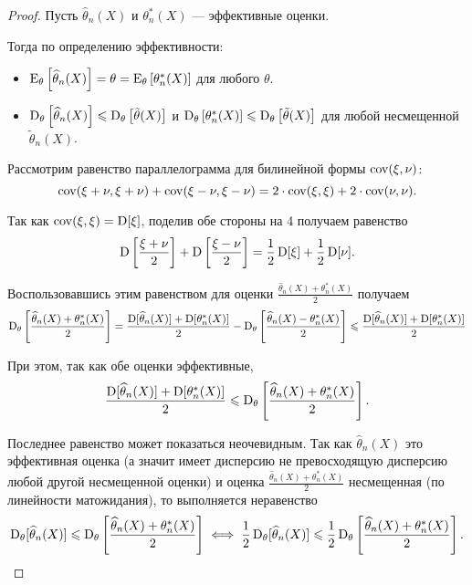 \begin{proof}
    Пусть $\widehat{\theta}_n(X)$ и $\theta_n^*(X)$ --- эффективные оценки.

    Тогда по определению эффективности:
    \begin{itemize}
    \item 
        $\operatorname{E}_{\theta}\left[\widehat{\theta}_n(X)\right] = \theta = \operatorname{E}_{\theta}\left[\theta_n^*(X)\right]$ для любого $\theta$.
    
    \item 
        $\operatorname{D}_{\theta}\left[\widehat{\theta}_n(X)\right] \leqslant \operatorname{D}_{\theta}\left[\tilde{\theta}(X)\right]$ и $\operatorname{D}_{\theta}\left[\theta_n^*(X)\right] \leqslant \operatorname{D}_{\theta}\left[\tilde{\theta}(X)\right]$ для любой несмещенной $\tilde{\theta}_n(X)$.
    \end{itemize}

    Рассмотрим равенство параллелограмма для билинейной формы $\operatorname{cov}(\xi, \nu)$:
    \begin{equation*}
        \operatorname{cov}(\xi + \nu, \xi + \nu) + \operatorname{cov}(\xi - \nu, \xi - \nu) = 2 \cdot \operatorname{cov}(\xi, \xi) + 2 \cdot \operatorname{cov}(\nu, \nu).
    \end{equation*}

    Так как $\operatorname{cov}(\xi, \xi) = \operatorname{D}[\xi]$, поделив обе стороны на 4 получаем равенство
    \begin{align*}
        \operatorname{D}\left[ \dfrac{\xi + \nu}{2} \right] + \operatorname{D}\left[ \dfrac{\xi - \nu}{2} \right] = \dfrac{1}{2} \operatorname{D}[\xi] + \dfrac{1}{2} \operatorname{D}[\nu].
    \end{align*}

    Воспользовавшись этим равенством для оценки $\frac{\widehat{\theta}_n(X) + \theta_n^*(X)}{2}$ получаем
    \begin{equation*}
        \operatorname{D}_{\theta}\left[ \dfrac{\widehat{\theta}_n(X) + \theta_n^*(X)}{2} \right]
        = \dfrac{\operatorname{D}[\widehat{\theta}_n(X)] + \operatorname{D}[\theta_n^*(X)]}{2} - \operatorname{D}_{\theta}\left[ \dfrac{\widehat{\theta}_n(X) - \theta_n^*(X)}{2} \right]
        \leqslant \dfrac{\operatorname{D}[\widehat{\theta}_n(X)] + \operatorname{D}[\theta_n^*(X)]}{2}
    \end{equation*}

    При этом, так как обе оценки эффективные,
    \begin{equation*}
        \dfrac{\operatorname{D}[\widehat{\theta}_n(X)] + \operatorname{D}[\theta_n^*(X)]}{2} \leqslant \operatorname{D}_{\theta}\left[ \dfrac{\widehat{\theta}_n(X) + \theta_n^*(X)}{2} \right].
    \end{equation*}

    Последнее равенство может показаться неочевидным. Так как $\widehat{\theta}_n(X)$ это эффективная оценка (а значит имеет дисперсию не превосходящую дисперсию любой другой несмещенной оценки) и оценка $\frac{\widehat{\theta}_n(X) + \theta_n^*(X)}{2}$ несмещенная (по линейности матожидания), то выполняется неравенство 
    \begin{equation*}
        \operatorname{D}_{\theta}[\widehat{\theta}_n(X)] \leqslant \operatorname{D}_{\theta}\left[ \dfrac{\widehat{\theta}_n(X) + \theta_n^*(X)}{2} \right] 
        \iff
        \dfrac{1}{2} \operatorname{D}_{\theta}[\widehat{\theta}_n(X)] \leqslant \dfrac{1}{2} \operatorname{D}_{\theta}\left[ \dfrac{\widehat{\theta}_n(X) + \theta_n^*(X)}{2} \right].
    \end{equation*}


\end{proof}
